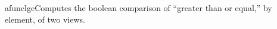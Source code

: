 afunc{lge}{Computes the boolean comparison of “greater than or equal,” by element, of two views.}
\\\cvsiplh
\\\pyjvsiph